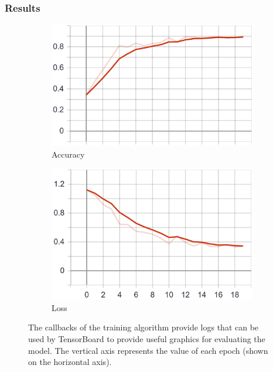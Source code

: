 \subsubsection{Results}
\begin{figure}
    \centering
    \begin{subfigure}[b]{0.4\textwidth}
        \includegraphics[width=\textwidth]{images/first_model_acc.png}
        \caption{Accuracy}
        \label{fig:first_model_acc}
    \end{subfigure}
    \begin{subfigure}[b]{0.4\textwidth}
        \includegraphics[width=\textwidth]{images/first_model_loss.png}
        \caption{Loss}
        \label{fig:first_model_loss}
    \end{subfigure}
    \caption{The callbacks of the training algorithm provide logs that can be used by TensorBoard to provide useful graphics for evaluating the model. The vertical axis represents the value of each epoch (shown on the horizontal axis).}
    \label{fig:first_model_graphs}
\end{figure}

